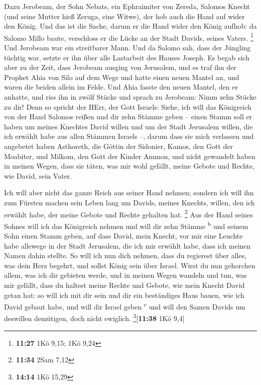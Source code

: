  Dazu Jerobeam, der Sohn Nebats, ein Ephraimiter von
Zereda, Salomos Knecht (und seine Mutter hieß Zeruga, eine Witwe), der
hob auch die Hand auf wider den König.  Und das ist die
Sache, darum er die Hand wider den König aufhob: da Salomo Millo baute,
verschloss er die Lücke an der Stadt Davids, seines Vaters. \footnote{\textbf{11:27}
  1Kö 9,15; 1Kö 9,24}  Und Jerobeam war ein streitbarer
Mann. Und da Salomo sah, dass der Jüngling tüchtig war, setzte er ihn
über alle Lastarbeit des Hauses Joseph.  Es begab sich
aber zu der Zeit, dass Jerobeam ausging von Jerusalem, und es traf ihn
der Prophet Ahia von Silo auf dem Wege und hatte einen neuen Mantel an,
und waren die beiden allein im Felde.  Und Ahia fasste
den neuen Mantel, den er anhatte, und riss ihn in zwölf Stücke
 und sprach zu Jerobeam: Nimm zehn Stücke zu dir! Denn so
spricht der HErr, der Gott Israels: Siehe, ich will das Königreich von
der Hand Salomos reißen und dir zehn Stämme geben -- 
einen Stamm soll er haben um meines Knechtes David willen und um der
Stadt Jerusalem willen, die ich erwählt habe aus allen Stämmen Israels
--,  darum dass sie mich verlassen und angebetet haben
Asthoreth, die Göttin der Sidonier, Kamos, den Gott der Moabiter, und
Milkom, den Gott der Kinder Ammon, und nicht gewandelt haben in meinen
Wegen, dass sie täten, was mir wohl gefällt, meine Gebote und Rechte,
wie David, sein Vater.

 Ich will aber nicht das ganze Reich aus seiner Hand
nehmen; sondern ich will ihn zum Fürsten machen sein Leben lang um
Davids, meines Knechts, willen, den ich erwählt habe, der meine Gebote
und Rechte gehalten hat. \footnote{\textbf{11:34} 2Sam 7,12}
 Aus der Hand seines Sohnes will ich das Königreich
nehmen und will dir zehn Stämme \textsuperscript{b}  und
seinem Sohn einen Stamm geben, auf dass David, mein Knecht, vor mir eine
Leuchte habe allewege in der Stadt Jerusalem, die ich mir erwählt habe,
dass ich meinen Namen dahin stellte.  So will ich nun
dich nehmen, dass du regierest über alles, was dein Herz begehrt, und
sollst König sein über Israel.  Wirst du nun gehorchen
allem, was ich dir gebieten werde, und in meinen Wegen wandeln und tun,
was mir gefällt, dass du haltest meine Rechte und Gebote, wie mein
Knecht David getan hat: so will ich mit dir sein und dir ein beständiges
Haus bauen, wie ich David gebaut habe, und will dir Israel geben
\textsuperscript{c}  und will den Samen Davids um
deswillen demütigen, doch nicht ewiglich. \footnote{\textbf{14:14} 1Kö
  15,29}{[}\textbf{11:38} 1Kö 9,4{]}

